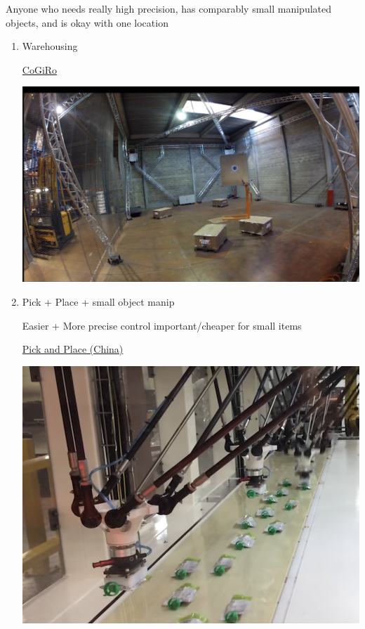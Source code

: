 \documentclass[11pt]{article}
\begin{document}
\begin{enumerate}
Anyone who needs really high precision, has comparably small manipulated objects, and is okay with one location


\begin{enumerate}
\item Warehousing
\label{sec:org807d9c1}

\href{https://www.youtube.com/watch?v=2b4YwFZhtIE}{CoGiRo}

\begin{center}
\includegraphics[width=.9\linewidth]{Applications/2022-07-18_12-43-16_screenshot.png}
\end{center}

\item Pick + Place + small object manip
\label{sec:org7b196ec}

Easier + More precise control important/cheaper for small items

\href{https://www.youtube.com/watch?v=QFZMhsVn\_CE}{Pick and Place (China)}

\begin{center}
\includegraphics[width=.9\linewidth]{Applications/2022-07-18_12-59-12_screenshot.png}
\end{center}


\end{enumerate}
\end{enumerate}
\end{document}
